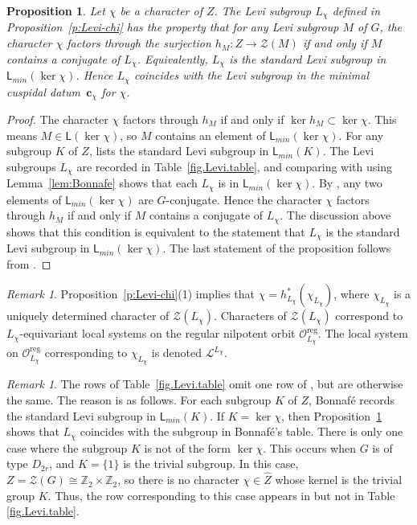 \documentclass[reqno,11pt]{amsart}
\newtheorem{Prop}[Thm]{Proposition}
\theoremstyle{remark}
\newtheorem{Rem}[Thm]{Remark}
\theoremstyle{remark}
\theoremstyle{definition}
\theoremstyle{definition}
\theoremstyle{definition}
\numberwithin{equation}{section}
\newcommand{\Z}{\mathbb{ Z}}           %
\renewcommand{\ker}{\operatorname{ker }}
\newcommand{\cl}{\mathcal{L}}
\newcommand{\co}{\mathcal{O}}
\newcommand{\cz}{\mathcal{Z}}
\newcommand{\vc}{\mathbf{c}}
\renewcommand{\hat}{\widehat}
\newcommand{\reg}{\mathrm{reg}}
\newcommand{\sfl}{\mathsf{L}}
\begin{document}
\begin{Prop} \label{p:L-chi}
Let $\chi$ be a character of $Z$.  The Levi subgroup $L_{\chi}$ defined in Proposition~\ref{p:Levi-chi} has the property that for any Levi subgroup $M$ of $G$,  the character $\chi$ factors through the surjection $h_M: Z \to \cz(M)$ if and only if $M$ contains a conjugate of $L_{\chi}$.   Equivalently, $L_{\chi}$ is the standard Levi subgroup in $\sfl_{min}(\ker \chi)$.  Hence $L_{\chi}$ coincides with the Levi subgroup in the minimal cuspidal datum~$\vc_{\chi}$ for $\chi$.
\end{Prop}

\begin{proof}
The character $\chi$ factors through $h_M$ if and only if $\ker h_M \subset \ker \chi$.  This means
$M \in \sfl(\ker \chi)$, so $M$ contains an element of $\sfl_{min}(\ker \chi)$.  
For any subgroup $K$ of $Z$, \cite[Table 2.17]{Bonnafe2004} lists the standard Levi subgroup in $\sfl_{min}(K)$.  The Levi subgroups $L_{\chi}$ are recorded in Table~\ref{fig.Levi.table}, and comparing with \cite[Table 2.17]{Bonnafe2004} using Lemma~\ref{lem:Bonnafe} shows that each $L_{\chi}$ is in $\sfl_{min}(\ker \chi)$.
By \cite[Lemma 2.16]{Bonnafe2004}, any two elements of $\sfl_{min}(\ker \chi)$ are $G$-conjugate.  Hence the character $\chi$ factors through $h_M$ if and only if $M$ contains a conjugate of $L_{\chi}$. 
The discussion above shows that this condition is equivalent to the statement that $L_{\chi}$ is the standard Levi subgroup in $\sfl_{min}(\ker \chi)$.
The last statement of the proposition follows from \cite[Prop.~5.1]{AHJR3}.
\end{proof}

\begin{Rem} \label{r:local}
Proposition~\ref{p:Levi-chi}(1) implies that $\chi = h_{L_{\chi}}^*(\chi_{L_\chi})$, where $\chi_{L_\chi}$ is a uniquely determined character of $\cz(L_{\chi})$.  Characters of $\cz(L_{\chi})$ correspond to $L_{\chi}$-equivariant local systems on the regular
nilpotent orbit $\co^{\reg}_{L_{\chi}}$.  The local system on $\co^{\reg}_{L_{\chi}}$ corresponding to
$\chi_{L_\chi}$ is denoted  $\cl^{L_\chi}$.
\end{Rem}

\begin{Rem} \label{r:bonnafe}
The rows of Table~\ref{fig.Levi.table} omit one row of \cite[Table 2.17]{Bonnafe2004}, but are otherwise the same.
The reason is as follows.  For each subgroup $K$ of $Z$, Bonnaf\'e records the standard Levi subgroup in $\sfl_{min}(K)$.
If $K = \ker \chi$, then Proposition~\ref{p:L-chi} shows that $L_{\chi}$ coincides with the subgroup in Bonnaf\'e's table.
There is only one case where the subgroup $K$ is not of the form $\ker \chi$.  This occurs when $G$ is of type $D_{2r}$,
and $K = \{ 1 \}$ is the trivial subgroup.  In this case, $Z=\cz(G) \cong \Z_2 \times \Z_2$, so there is no character $\chi\in \hat{Z}$ whose kernel is
the trivial group $K$.  Thus, the row corresponding to this case appears in \cite[Table 2.17]{Bonnafe2004} but not in Table \ref{fig.Levi.table}.
\end{Rem}
\end{document}
